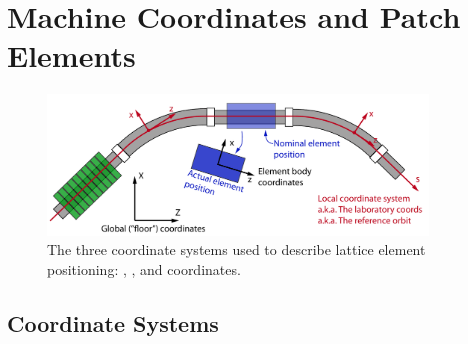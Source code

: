 \documentclass{hitec}     %
\newcommand{\Section}[1]{\section{#1}\vspace*{-1ex}}
\begin{document}
\newpage

\Section{Machine Coordinates and Patch Elements}
\label{s:coords}

\begin{figure}[tb]
  \centering
  \includegraphics[width=0.9\textwidth]{coordinates.pdf}
  \caption{The three coordinate systems used to describe lattice element positioning:
, , and  coordinates.}
  \label{f:coordinates}
\end{figure}

\subsection{Coordinate Systems}
\label{s:coord.sys}
\end{document}
